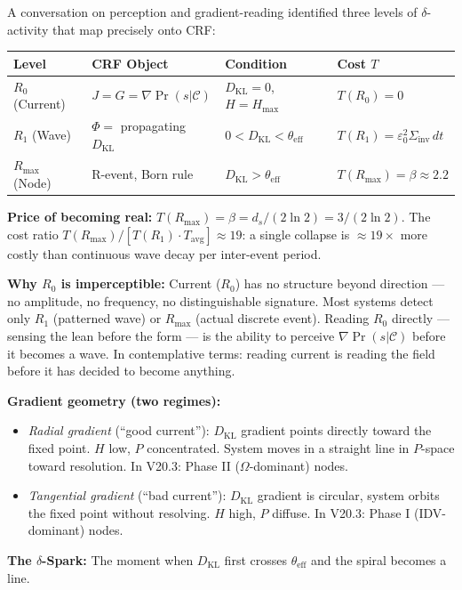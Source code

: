 \documentclass[12pt, a4paper]{article}
\begin{document}
\begin{derivedbox}[title={Resolution Scale: $R_0$, $R_1$, $R_{\max}$ from $\delta$-Chain}]
A conversation on perception and gradient-reading identified three levels of $\delta$-activity
that map precisely onto CRF:

\begin{center}
\renewcommand{\arraystretch}{1.3}
\begin{tabular}{p{2.2cm} p{4cm} p{3cm} p{4cm}}
\toprule
\textbf{Level} & \textbf{CRF Object} & \textbf{Condition} & \textbf{Cost $T$} \\
\midrule
$R_0$ (Current) & $J = G = \nabla\Pr(s|\mathcal{C})$ & $D_{\mathrm{KL}} = 0$, $H = H_{\max}$ & $T(R_0) = 0$ \\
$R_1$ (Wave) & $\Phi = $ propagating $D_{\mathrm{KL}}$ & $0 < D_{\mathrm{KL}} < \theta_{\mathrm{eff}}$ & $T(R_1) = \varepsilon_0^2\Sigma_{\mathrm{inv}}\,dt$ \\
$R_{\max}$ (Node) & R-event, Born rule & $D_{\mathrm{KL}} > \theta_{\mathrm{eff}}$ & $T(R_{\max}) = \beta \approx 2.2$ \\
\bottomrule
\end{tabular}
\end{center}

\textbf{Price of becoming real:} $T(R_{\max}) = \beta = d_s/(2\ln 2) = 3/(2\ln 2)$.
The cost ratio $T(R_{\max}) / [T(R_1)\cdot T_{\mathrm{avg}}] \approx 19$: a single collapse
is $\approx 19\times$ more costly than continuous wave decay per inter-event period.

\textbf{Why $R_0$ is imperceptible:} Current ($R_0$) has no structure beyond direction ---
no amplitude, no frequency, no distinguishable signature. Most systems detect only $R_1$
(patterned wave) or $R_{\max}$ (actual discrete event). Reading $R_0$ directly --- sensing
the lean before the form --- is the ability to perceive $\nabla\Pr(s|\mathcal{C})$ before
it becomes a wave. In contemplative terms: reading current is reading the field before it
has decided to become anything.

\textbf{Gradient geometry (two regimes):}
\begin{itemize}
\item \emph{Radial gradient} (``good current''): $D_{\mathrm{KL}}$ gradient points directly
toward the fixed point. $H$ low, $P$ concentrated. System moves in a straight line in
$P$-space toward resolution. In V20.3: Phase II ($\Omega$-dominant) nodes.
\item \emph{Tangential gradient} (``bad current''): $D_{\mathrm{KL}}$ gradient is circular,
system orbits the fixed point without resolving. $H$ high, $P$ diffuse. In V20.3:
Phase I (IDV-dominant) nodes.
\end{itemize}

\textbf{The $\delta$-Spark:} The moment when $D_{\mathrm{KL}}$ first crosses $\theta_{\mathrm{eff}}$
and the spiral becomes a line.
\end{derivedbox}
\end{document}
